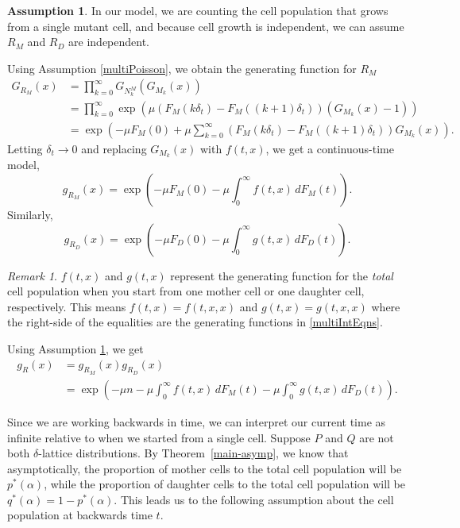 \documentclass[12pt]{amsart}
\theoremstyle{plain}
\theoremstyle{definition}
\theoremstyle{remark}
\newtheorem*{rem}{Remark}
\theoremstyle{definition}
\newtheorem{assume}[thm]{Assumption}
\begin{document}
\begin{assume} \label{Rindep}
In our model, we are counting the cell population that grows from a single mutant cell, and because cell growth is independent, we can assume $R_M$ and $R_D$ are independent.
\end{assume}

Using Assumption \ref{multiPoisson}, we obtain the generating function for $R_M$
\begin{equation}
\begin{aligned}
G_{R_M}(x) & = \prod_{k=0}^\infty G_{N^M_k}(G_{M_k}(x)) \\
& = \prod_{k=0}^\infty \exp\left( \mu \left( F_M(k\delta_t)-F_M((k+1)\delta_t) \right)(G_{M_k}(x)-1) \right) \\
& = \exp\left(-\mu F_M(0) + \mu \sum_{k=0}^\infty \left( F_M(k\delta_t)-F_M((k+1)\delta_t) \right) G_{M_k}(x)\right) \label{GrM}.
\end{aligned}
\end{equation}
Letting $\delta_t \to 0$ and replacing $G_{M_k}(x)$ with $f(t,x)$, we get a continuous-time model,
\begin{equation}
g_{R_M}(x) = \exp\left(-\mu F_M(0) - \mu \int_0^\infty f(t,x) \, dF_M(t) \right).
\end{equation}
Similarly,
\begin{equation}
g_{R_D}(x) = \exp\left(-\mu F_D(0) - \mu \int_0^\infty g(t,x) \, dF_D(t) \right).
\end{equation}

\begin{rem}
$f(t,x)$ and $g(t,x)$ represent the generating function for the \emph{total} cell population when you start from one mother cell or one daughter cell, respectively. This means $f(t,x) = f(t,x,x)$ and $g(t,x) = g(t,x,x)$ where the right-side of the equalities are the generating functions in \eqref{multiIntEqns}.
\end{rem}
Using Assumption \ref{Rindep}, we get
\begin{equation}
\begin{aligned}
g_R(x) & = g_{R_M}(x)g_{R_D}(x) \\
& = \exp\left(-\mu n - \mu \int_0^\infty f(t,x) \, dF_M(t) -\mu \int_0^\infty g(t,x) \, dF_D(t) \right) \label{grMulti}.
\end{aligned}
\end{equation}

Since we are working backwards in time, we can interpret our current time as infinite relative to when we started from a single cell.  Suppose $P$ and $Q$ are not both $\delta$-lattice distributions. By Theorem~\ref{main-asymp}, we know that asymptotically, the proportion of mother cells to the total cell population will be $p^*(\alpha)$, while the proportion of daughter cells to the total cell population will be $q^*(\alpha) = 1 - p^*(\alpha)$.
This leads us to the following assumption about the cell population at backwards time $t$.
\end{document}

